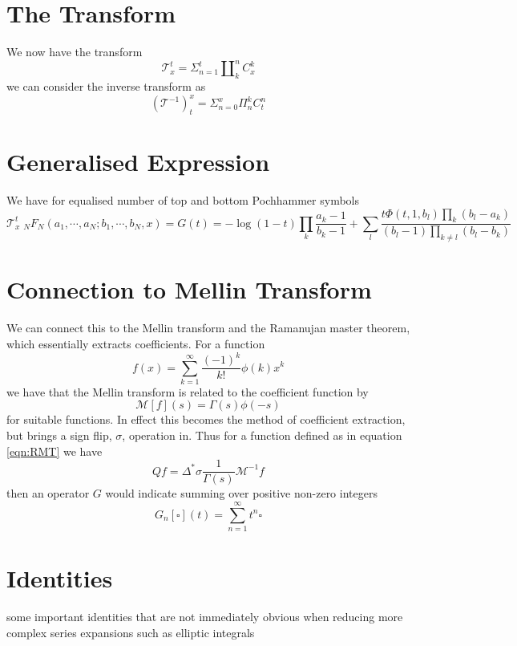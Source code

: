 \documentclass{article}
\begin{document}
\section{The Transform}
We now have the transform
\begin{equation}
\mathcal{T}_x^t = \Sigma_{n=1}^t \amalg_k^n C_x^k
\end{equation}
we can consider the inverse transform as 
\begin{equation}
(\mathcal{T}^{-1})_{t}^x = \Sigma_{n=0}^x \Pi_n^k C_t^n
\end{equation}

\section{Generalised Expression}
We have for equalised number of top and bottom Pochhammer symbols
\begin{equation}
\mathcal{T}_x^t \;_NF_N(a_1,\cdots,a_N;b_1,\cdots,b_N,x)= G(t) =  - \log(1-t)\prod_k \frac{a_k-1}{b_k-1} + \sum_{l} \frac{t \Phi(t,1,b_l)\prod_k (b_l-a_k)}{(b_l-1)\prod_{k\ne l} (b_l-b_k)} 
\end{equation}


\section{Connection to Mellin Transform}
We can connect this to the Mellin transform and the Ramanujan master theorem, which essentially extracts coefficients. For a function 
\begin{equation}
f(x) = \sum_{k=1}^\infty \frac{(-1)^k}{k!} \phi(k) x^k
\label{eqn:RMT}
\end{equation}
we have that the Mellin transform is related to the coefficient function by 
$$
\mathcal{M}[f](s) = \Gamma(s)\phi(-s)
$$
for suitable functions. In effect this becomes the method of coefficient extraction, but brings a sign flip, $\sigma$, operation in. Thus for a function defined as in equation \ref{eqn:RMT} we have
$$
Q f = \Delta^* \sigma \frac{1}{\Gamma(s)} \mathcal{M}^{-1} f
$$
then an operator $G$ would indicate summing over positive non-zero integers
$$
G_n[\square](t) = \sum_{n=1}^\infty t^n \square
$$


\section{Identities}
some important identities that are not immediately obvious when reducing more complex series expansions such as elliptic integrals
\end{document}
